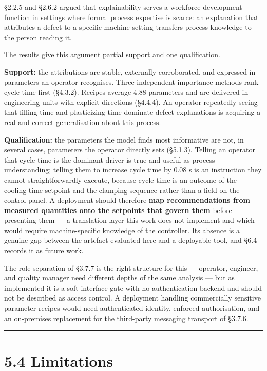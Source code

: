 §2.2.5 and §2.6.2 argued that explainability serves a workforce-development function in settings where formal process expertise is scarce: an explanation that attributes a defect to a specific machine setting transfers process knowledge to the person reading it.

The results give this argument partial support and one qualification.

\textbf{Support:} the attributions are stable, externally corroborated, and expressed in parameters an operator recognises. Three independent importance methods rank cycle time first (§4.3.2). Recipes average 4.88 parameters and are delivered in engineering units with explicit directions (§4.4.4). An operator repeatedly seeing that filling time and plasticizing time dominate defect explanations is acquiring a real and correct generalisation about this process.

\textbf{Qualification:} the parameters the model finds most informative are not, in several cases, parameters the operator directly sets (§5.1.3). Telling an operator that cycle time is the dominant driver is true and useful as process understanding; telling them to increase cycle time by 0.08 s is an instruction they cannot straightforwardly execute, because cycle time is an outcome of the cooling-time setpoint and the clamping sequence rather than a field on the control panel. A deployment should therefore \textbf{map recommendations from measured quantities onto the setpoints that govern them} before presenting them --- a translation layer this work does not implement and which would require machine-specific knowledge of the controller. Its absence is a genuine gap between the artefact evaluated here and a deployable tool, and §6.4 records it as future work.

The role separation of §3.7.7 is the right structure for this --- operator, engineer, and quality manager need different depths of the same analysis --- but as implemented it is a soft interface gate with no authentication backend and should not be described as access control. A deployment handling commercially sensitive parameter recipes would need authenticated identity, enforced authorisation, and an on-premises replacement for the third-party messaging transport of §3.7.6.

\begin{center}\rule{0.5\linewidth}{0.5pt}\end{center}

\hypertarget{limitations}{%
\section{5.4 Limitations}\label{limitations}}

